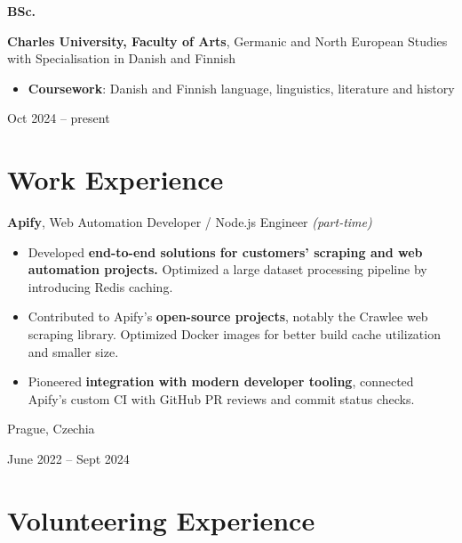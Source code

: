 \documentclass[10pt, a4paper]{article}
\newenvironment{highlights}{
    \begin{itemize}[
        topsep=0.08 cm,
        parsep=0.05 cm,
        partopsep=0pt,
        itemsep=0pt,
        leftmargin=0.4 cm + 10pt
    ]
}{
    \end{itemize}
} %
\newenvironment{twocolentry}[2][]{
    \onecolentry
    \def\secondColumn{#2}
    \setcolumnwidth{\fill, 4.2 cm}
    \begin{paracol}{2}
}{
    \switchcolumn \raggedleft \secondColumn
    \end{paracol}
    \endonecolentry
} %
\newenvironment{threecolentry}[3][]{
    \onecolentry
    \def\thirdColumn{#3}
    \setcolumnwidth{1 cm, \fill, 4.2 cm}
    \begin{paracol}{3}
    {\raggedright #2} \switchcolumn
}{
    \switchcolumn \raggedleft \thirdColumn
    \end{paracol}
    \endonecolentry
} %
\begin{document}
        \vspace{0.2 cm}

        \begin{threecolentry}{\textbf{BSc.}}{
            Oct 2024 – present
        }
            \textbf{Charles University, Faculty of Arts}, \newline Germanic and North European Studies with Specialisation in Danish and Finnish
            \begin{highlights}
                \item \textbf{Coursework}: Danish and Finnish language, linguistics, literature and history
            \end{highlights}
        \end{threecolentry}


    
    \section{Work Experience}



        
        \begin{twocolentry}{
            Prague, Czechia

        June 2022 – Sept 2024
        }
            \textbf{Apify}, Web Automation Developer / Node.js Engineer \textit{(part-time)}
            \begin{highlights}
                \item Developed \textbf{end-to-end solutions for customers' scraping and web automation projects.} Optimized a large dataset processing pipeline by introducing Redis caching.
                \item Contributed to Apify's \textbf{open-source projects}, notably the Crawlee web scraping library. Optimized Docker images for better build cache utilization and smaller size.
                \item Pioneered \textbf{integration with modern developer tooling}, connected Apify's custom CI with GitHub PR reviews and commit status checks.
            \end{highlights}
        \end{twocolentry}



    
    \section{Volunteering Experience}
\end{document}
